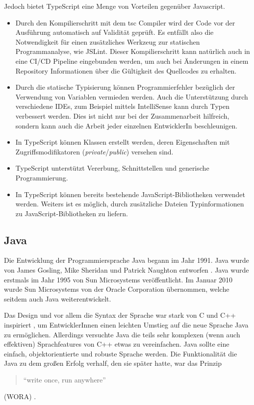Jedoch bietet TypeScript eine Menge von Vorteilen 
gegenüber Javascript.
\begin{itemize}
  \item Durch den Kompilierschritt mit dem tsc Compiler wird der 
    Code vor der Ausführung automatisch auf Validität geprüft. 
    Es entfällt also die Notwendigkeit für einen zusätzliches Werkzeug 
    zur statischen Programmanalyse, wie JSLint. 
    Dieser Kompilierschritt kann natürlich auch in eine 
    CI/CD Pipeline eingebunden werden, um auch bei Änderungen in einem
    Repository Informationen über die Gültigkeit des Quellcodes zu erhalten.
  \item Durch die statische Typisierung können Programmierfehler bezüglich
    der Verwendung von Variablen vermieden werden. Auch die Unterstützung 
    durch verschiedene IDEs, zum Beispiel mittels IntelliSense kann durch 
    Typen verbessert werden. Dies ist nicht nur bei der Zusammenarbeit hilfreich, 
    sondern kann auch die Arbeit jeder einzelnen EntwicklerIn beschleunigen.
  \item In TypeScript können Klassen erstellt werden, deren Eigenschaften mit 
    Zugriffsmodifikatoren (\emph{private}/\emph{public}) versehen sind.
  \item TypeScript unterstützt Vererbung, Schnittstellen und generische Programmierung.
  \item In TypeScript können bereits bestehende JavaScript-Bibliotheken 
    verwendet werden. Weiters ist es möglich, durch zusätzliche Dateien 
    Typinformationen zu \linebreak
    JavaScript-Bibliotheken zu liefern.
\end{itemize}

\subsection{Java}

Die Entwicklung der Programmiersprache Java begann im Jahr 1991. Java 
wurde von James Gosling, Mike Sheridan und Patrick Naughton entworfen \cite{WinnieDoug2021EJfA}.
Java wurde erstmals im Jahr 1995 von Sun Microsystems veröffentlicht. 
Im Januar 2010 wurde Sun Microsystems von der Oracle Corporation übernommen, 
welche seitdem auch Java weiterentwickelt.

Das Design und vor allem die Syntax der Sprache war stark von C und C++ inspiriert \cite{ArnoldKen1996TJpl}, 
um EntwicklerInnen einen leichten Umstieg auf die neue Sprache Java zu ermöglichen. 
Allerdings versuchte Java die teils sehr komplexen (wenn auch effektiven) 
Sprachfeatures von C++ etwas zu vereinfachen. Java sollte eine einfach, objektorientierte 
und robuste Sprache werden. Die Funktionalität die Java zu dem großen Erfolg verhalf, 
den sie später hatte, war das Prinzip
\begin{quote}\begin{english}\enquote{write once, run anywhere}\end{english}\end{quote}
(WORA) \cite{SharanKishori2022BJ1f}. 

